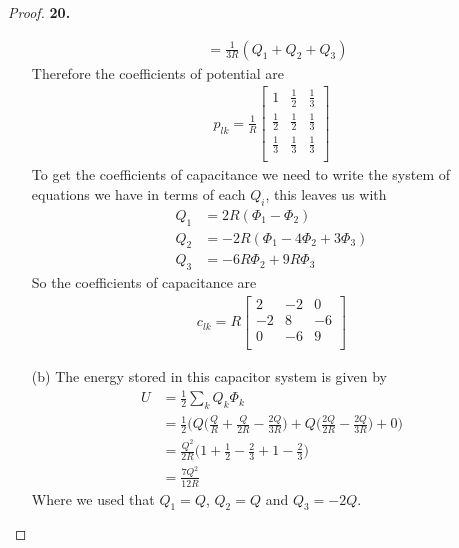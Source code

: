 \documentclass[11pt]{article}
\theoremstyle{definition}
\begin{document}
\begin{proof}{\textbf{20.}}
\begin{itemize}
\begin{align*}
    &= \frac{1}{3R}(Q_1 + Q_2 + Q_3)
\end{align*}
Therefore the coefficients of potential are
\begin{align*}
    p_{lk} = \frac{1}{R}\begin{bmatrix}
        1 & \frac{1}{2} & \frac{1}{3}\\[6pt]
        \frac{1}{2} & \frac{1}{2} & \frac{1}{3}\\[6pt]
        \frac{1}{3} & \frac{1}{3} & \frac{1}{3}\\
    \end{bmatrix}
\end{align*}
To get the coefficients of capacitance we need to write the system of equations
we have in terms of each $Q_i$, this leaves us with
\begin{align*}
    Q_1 &= 2R(\Phi_1 - \Phi_2)\\
    Q_2 &= -2R(\Phi_1 - 4\Phi_2 + 3\Phi_3)\\
    Q_3 &= -6R\Phi_2 + 9R\Phi_3
\end{align*}
So the coefficients of capacitance are
\begin{align*}
    c_{lk} = R\begin{bmatrix}
        2 & -2 & 0\\[6pt]
        -2 & 8 & -6\\[6pt]
        0 & -6 & 9\\
    \end{bmatrix}
\end{align*}

\item [(b)] The energy stored in this capacitor system is given by
\begin{align*}
    U &= \frac{1}{2}\sum_k Q_k \Phi_k\\
    &= \frac{1}{2}\bigg(Q\bigg(\frac{Q}{R} + \frac{Q}{2R} - \frac{2Q}{3R}\bigg)
    + Q\bigg(\frac{2Q}{2R} - \frac{2Q}{3R}\bigg)
    + 0 \bigg)\\
    &= \frac{Q^2}{2R}\bigg(1 + \frac{1}{2} - \frac{2}{3}
    + 1 - \frac{2}{3}\bigg)\\
    &= \frac{7Q^2}{12R}
\end{align*}
Where we used that $Q_1 = Q$, $Q_2 = Q$ and $Q_3 = -2Q$.
\end{itemize}
\end{proof}
\end{document}
